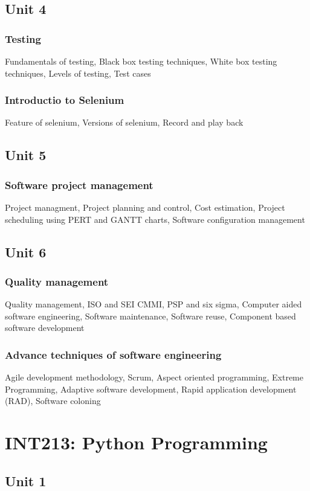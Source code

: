 \documentclass[twocolumn]{article}
\begin{document}
    \subsection*{Unit 4}
    \subsubsection*{Testing}
    Fundamentals of testing, Black box testing techniques, White box testing techniques, Levels of testing, Test cases
    \subsubsection*{Introductio to Selenium}
    Feature of selenium, Versions of selenium, Record and play back
    \subsection*{Unit 5}
    \subsubsection*{Software project management }
    Project managment, Project planning and control, Cost estimation, Project scheduling using PERT and GANTT charts, Software configuration management
    \subsection*{Unit 6}
    \subsubsection*{Quality management}
    Quality management, ISO and SEI CMMI, PSP and six sigma, Computer aided software engineering, Software maintenance, Software reuse, Component based software development
    \subsubsection*{Advance techniques of software engineering}
    Agile development methodology, Scrum, Aspect oriented programming, Extreme Programming, Adaptive software development, Rapid application development (RAD), Software coloning
    \section*{INT213: Python Programming}
    \subsection*{Unit 1}
\end{document}
